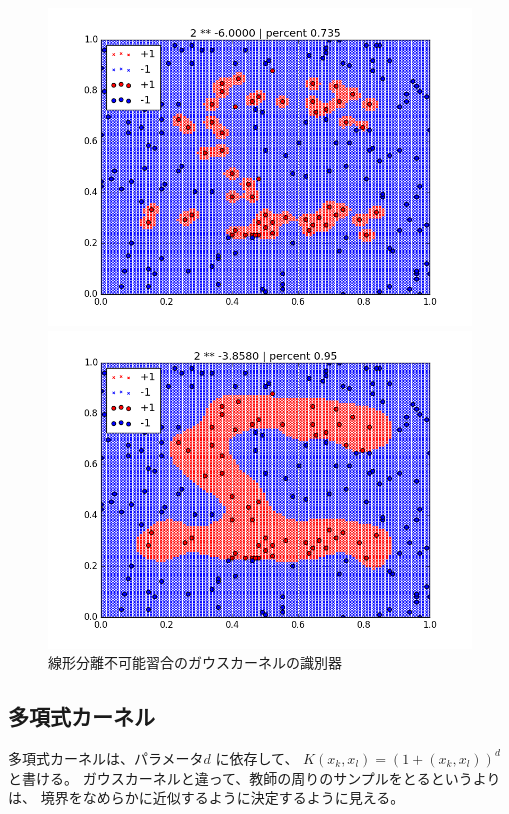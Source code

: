 \documentclass[]{jsarticle}
\begin{document}
\begin{figure}[htbp]
 \begin{minipage}[b]{0.5\hsize}
  \includegraphics[scale=0.4]{./cross_validate_images/gauss_te/1.png}
 \end{minipage}
 \begin{minipage}[b]{0.5\hsize}
  \includegraphics[scale=0.4]{./cross_validate_images/gauss_te/4.png}
 \end{minipage}
 \caption{線形分離不可能習合のガウスカーネルの識別器}
\end{figure}

\newpage
\subsection{多項式カーネル}
多項式カーネルは、パラメータ$d$ に依存して、
$K(x_k,x_l) = (1+(x_k,x_l))^d $ と書ける。
ガウスカーネルと違って、教師の周りのサンプルをとるというよりは、
境界をなめらかに近似するように決定するように見える。
\end{document}

